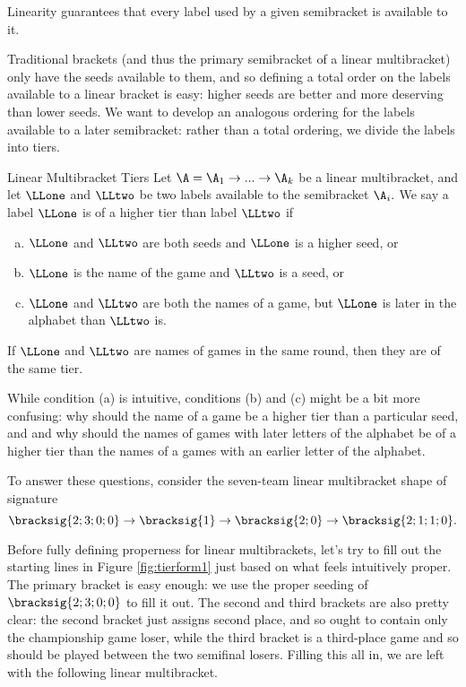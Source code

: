 {    Linearity guarantees that every label used by a given semibracket is available to it.

    Traditional brackets (and thus the primary semibracket of a linear multibracket) only have the seeds available to them, and so defining a total order on the labels available to a linear bracket is easy: higher seeds are better and more deserving than lower seeds. We want to develop an analogous ordering for the labels available to a later semibracket: rather than a total ordering, we divide the labels into tiers.

    \begin{definition}{Linear Multibracket Tiers}{}
        Let $\A = \A_1 \to ... \to \A_k$ be a linear multibracket, and let $\LLone$ and $\LLtwo$ be two labels available to the semibracket $\A_i.$ We say a label $\LLone$ is of a higher tier than label $\LLtwo$ if
        \begin{enumerate}[(a)]
            \item $\LLone$ and $\LLtwo$ are both seeds and $\LLone$ is a higher seed, or
            \item $\LLone$ is the name of the game and $\LLtwo$ is a seed, or
            \item $\LLone$ and $\LLtwo$ are both the names of a game, but $\LLone$ is later in the alphabet than $\LLtwo$ is.
        \end{enumerate}
        If $\LLone$ and $\LLtwo$ are names of games in the same round, then they are of the same tier.
    \end{definition}

    While condition (a) is intuitive, conditions (b) and (c) might be a bit more confusing: why should the name of a game be a higher tier than a particular seed, and and why should the names of games with later letters of the alphabet be of a higher tier than the names of a games with an earlier letter of the alphabet.

    To answer these questions, consider the seven-team linear multibracket shape of signature $$\bracksig{2;3;0;0} \to \bracksig{1} \to \bracksig{2;0} \to \bracksig{2;1;1;0}.$$


    Before fully defining properness for linear multibrackets, let's try to fill out the starting lines in Figure \ref{fig:tierform1} just based on what feels intuitively proper. The primary bracket is easy enough: we use the proper seeding of $\bracksig{2;3;0;0}$ to fill it out. The second and third brackets are also pretty clear: the second bracket just assigns second place, and so ought to contain only the championship game loser, while the third bracket is a third-place game and so should be played between the two semifinal losers. Filling this all in, we are left with the following linear multibracket.

}
